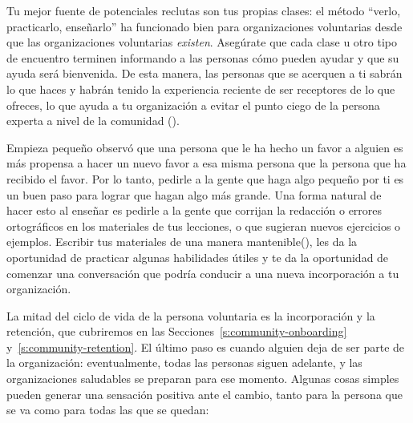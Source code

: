 Tu mejor fuente de potenciales reclutas son tus propias clases:
el método ``verlo, practicarlo, enseñarlo'' ha funcionado bien para organizaciones voluntarias
desde que las organizaciones voluntarias \emph{existen}.
Asegúrate que cada clase u otro tipo de encuentro
terminen informando a las personas cómo pueden ayudar y que su ayuda será bienvenida.
De esta manera, las personas que se acerquen a ti sabrán lo que haces
y habrán tenido la experiencia reciente de ser receptores de lo que ofreces,
lo que ayuda a tu organización a evitar el punto ciego de la persona experta a nivel de la comunidad ().

\begin{aside}{Empieza pequeño}
   observó que
  una persona que le ha hecho un favor a alguien
  es más propensa a hacer un nuevo favor a esa misma persona
  que la persona que ha recibido el favor. 
  Por lo tanto, pedirle a la gente que haga algo pequeño por ti
  es un buen paso para lograr que hagan algo más grande.
  Una forma natural de hacer esto al enseñar
  es pedirle a la gente que corrijan la redacción o errores ortográficos en los materiales de tus lecciones,
  o que sugieran nuevos ejercicios o ejemplos.
  Escribir tus materiales de una manera mantenible(),
  les da la oportunidad de practicar algunas habilidades útiles
  y te da la oportunidad de comenzar una conversación
  que podría conducir a una nueva incorporación a tu organización.
\end{aside}


La mitad del ciclo de vida de la persona voluntaria es la incorporación y la retención,
que cubriremos en las Secciones~\ref{s:community-onboarding} y~\ref{s:community-retention}.
El último paso es cuando alguien deja de ser parte de la organización:
eventualmente, todas las personas siguen adelante,
y las organizaciones saludables se preparan para ese momento.
Algunas cosas simples pueden generar una sensación positiva ante el cambio, tanto para la persona que se va como para todas las que se quedan:


